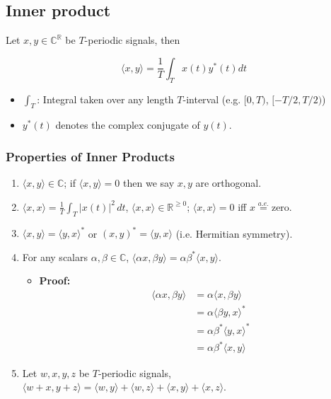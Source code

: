 \subsection{Inner product}
\begin{definition}
    Let \( x, y \in \mathbb{C}^{\mathbb{R}} \) be \( T \)-periodic signals, then
    
    \[
    \langle x, y \rangle = \frac{1}{T} \int_T x(t) y^*(t) dt
    \]
    \begin{itemize}
        \item $\int_T$: Integral taken over any length \( T \)-interval (e.g. $[0,T)$, $[-T/2,T/2)$)
        \item \( y^*(t) \) denotes the complex conjugate of \( y(t) \).
    \end{itemize}
\end{definition}

\subsubsection{Properties of Inner Products}
\begin{definition}
    \begin{enumerate}
        \item $\langle x, y \rangle \in \mathbb{C}$; if $\langle x, y \rangle = 0$ then we say $x, y$ are orthogonal.
        \item $\langle x, x \rangle = \frac{1}{T} \int_T |x(t)|^2 \, dt$, \quad $\langle x, x \rangle \in \mathbb{R}^{\geq 0}$; \quad $\langle x, x \rangle = 0$ iff $x \overset{a.e.}{=} \text{zero}$.
        \item $\langle x, y \rangle = \langle y, x \rangle^*$ \quad or \quad $(x, y)^* = \langle y, x \rangle$ \quad (i.e. Hermitian symmetry).
        \item For any scalars $\alpha, \beta \in \mathbb{C}$, \quad $\langle \alpha x, \beta y \rangle = \alpha \beta^* \langle x, y \rangle$.
        \begin{itemize}
            \item \textbf{Proof:}
            \begin{align*}
                \langle \alpha x, \beta y \rangle &= \alpha \langle x, \beta y \rangle \\
                &= \alpha \langle \beta y, x \rangle^* \\
                &= \alpha \beta^* \langle y, x \rangle^* \\
                &= \alpha \beta^* \langle x, y \rangle
            \end{align*}
        \end{itemize}
        \item Let $w, x, y, z$ be $T$-periodic signals, $\langle w + x, y + z \rangle = \langle w, y \rangle + \langle w, z \rangle + \langle x, y \rangle + \langle x, z \rangle$.
    \end{enumerate}    
\end{definition}

